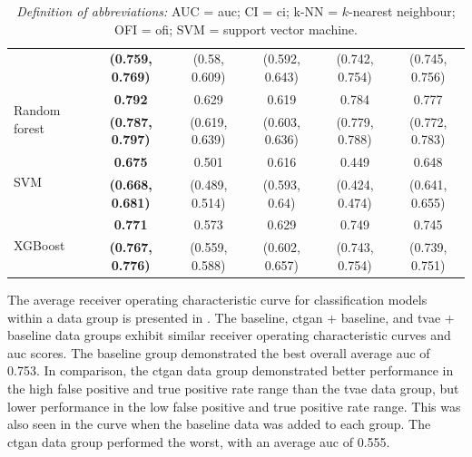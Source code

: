 \documentclass[12pt, a4paper]{article}
\begin{document}
\begin{table}
{\begin{tabular}{lccccc}
                                                 & \textbf{(0.759, 0.769)} & (0.58, 0.609)  & (0.592, 0.643) & (0.742, 0.754)            & (0.745, 0.756)           \\[0.5em]
            \multirow{2}{*}{Random forest}       & \textbf{0.792}          & 0.629          & 0.619          & 0.784                     & 0.777                    \\
                                                 & \textbf{(0.787, 0.797)} & (0.619, 0.639) & (0.603, 0.636) & (0.779, 0.788)            & (0.772, 0.783)           \\[0.5em]
            \multirow{2}{*}{SVM}                 & \textbf{0.675}          & 0.501          & 0.616          & 0.449                     & 0.648                    \\
                                                 & \textbf{(0.668, 0.681)} & (0.489, 0.514) & (0.593, 0.64)  & (0.424, 0.474)            & (0.641, 0.655)           \\[0.5em]
            \multirow{2}{*}{XGBoost}             & \textbf{0.771}          & 0.573          & 0.629          & 0.749                     & 0.745                    \\
                                                 & \textbf{(0.767, 0.776)} & (0.559, 0.588) & (0.602, 0.657) & (0.743, 0.754)            & (0.739, 0.751)           \\
            \bottomrule
        \end{tabular}

    }
    \caption*{\small \textit{Definition of abbreviations:} AUC = \acrlong{auc}; CI = \acrlong{ci}; k-NN = $k$-nearest neighbour; OFI = \acrlong{ofi}; SVM = support vector machine.}
\end{table}

The average receiver operating characteristic curve for classification models within a data group is presented in . The baseline, \acrshort{ctgan} + baseline, and \acrshort{tvae} + baseline data groups exhibit similar receiver operating characteristic curves and \acrshort{auc} scores. The baseline group demonstrated the best overall average \acrshort{auc} of 0.753. In comparison, the \acrshort{ctgan} data group demonstrated better performance in the high false positive and true positive rate range than the \acrshort{tvae} data group, but lower performance in the low false positive and true positive rate range. This was also seen in the curve when the baseline data was added to each group. The \acrshort{ctgan} data group performed the worst, with an average \acrshort{auc} of 0.555.
\end{document}
